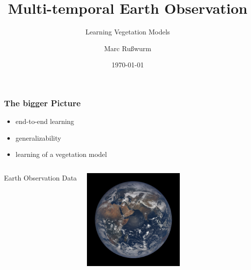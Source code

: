 \documentclass[%
  aspectratio=169,
  9pt,
  USenglish,
  titlegraphic, %
  affiliationintitlepagehead,
  progressbar,
]{beamer}
\title{Multi-temporal Earth Observation}
\subtitle{Learning Vegetation Models}
\author[M. Rußwurm]{Marc Rußwurm}
\institute[TUM]{Technical University of Munich, Germany\\
                Remote Sensing Technology}
\date{\today}
\begin{document}
\begin{frame}[t]
  \titlepage
\end{frame}

\begin{frame}
  \frametitle{The bigger Picture}
  \begin{itemize}
  	\item end-to-end learning
  	\item generalizability
  	\item learning of a vegetation model
  \end{itemize}
\end{frame}


{
	\begin{frame}[plain]
	
	\vfill
	\Huge\color{white}
	\begin{center}
		\begin{columns}
			\vspace{7em}
			
			\hfill 
			Earth Observation Data
			
			\includegraphics[width=5cm]{images/epic1}
		\end{columns}
	\end{center}
	
	\vfill
\end{frame}
}











\end{document}
